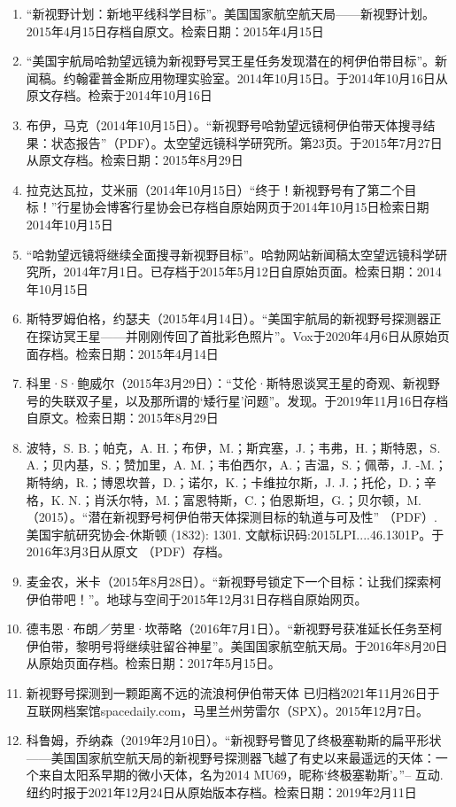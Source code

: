 \begin{enumerate}
\item “新视野计划：新地平线科学目标”。美国国家航空航天局——新视野计划。2015年4月15日存档自原文。检索日期：2015年4月15日
\item “美国宇航局哈勃望远镜为新视野号冥王星任务发现潜在的柯伊伯带目标”。新闻稿。约翰霍普金斯应用物理实验室。2014年10月15日。于2014年10月16日从原文存档。检索于2014年10月16日
\item 布伊，马克（2014年10月15日）。“新视野号哈勃望远镜柯伊伯带天体搜寻结果：状态报告”（PDF）。太空望远镜科学研究所。第23页。于2015年7月27日从原文存档。检索日期：2015年8月29日
\item 拉克达瓦拉，艾米丽（2014年10月15日）“终于！新视野号有了第二个目标！”行星协会博客行星协会已存档自原始网页于2014年10月15日检索日期2014年10月15日
\item “哈勃望远镜将继续全面搜寻新视野目标”。哈勃网站新闻稿太空望远镜科学研究所，2014年7月1日。已存档于2015年5月12日自原始页面。检索日期：2014年10月15日
\item 斯特罗姆伯格，约瑟夫（2015年4月14日）。“美国宇航局的新视野号探测器正在探访冥王星——并刚刚传回了首批彩色照片”。Vox于2020年4月6日从原始页面存档。检索日期：2015年4月14日
\item 科里·S·鲍威尔（2015年3月29日）：“艾伦·斯特恩谈冥王星的奇观、新视野号的失联双子星，以及那所谓的‘矮行星’问题”。发现。于2019年11月16日存档自原文。检索日期：2015年8月29日
\item 波特，S. B.；帕克，A. H.；布伊，M.；斯宾塞，J.；韦弗，H.；斯特恩，S. A.；贝内基，S.；赞加里，A. M.；韦伯西尔，A.；吉温，S.；佩蒂，J. -M.；斯特纳，R.；博恩坎普，D.；诺尔，K.；卡维拉尔斯，J. J.；托伦，D.；辛格，K. N.；肖沃尔特，M.；富恩特斯，C.；伯恩斯坦，G.；贝尔顿，M.（2015）。“潜在新视野号柯伊伯带天体探测目标的轨道与可及性” （PDF）. 美国宇航研究协会-休斯顿 (1832): 1301. 文献标识码:2015LPI....46.1301P。于2016年3月3日从原文 （PDF）存档。
\item 麦金农，米卡（2015年8月28日）。“新视野号锁定下一个目标：让我们探索柯伊伯带吧！”。地球与空间于2015年12月31日存档自原始网页。
\item 德韦恩·布朗／劳里·坎蒂略（2016年7月1日）。“新视野号获准延长任务至柯伊伯带，黎明号将继续驻留谷神星”。美国国家航空航天局。于2016年8月20日从原始页面存档。检索日期：2017年5月15日。
\item 新视野号探测到一颗距离不远的流浪柯伊伯带天体 已归档2021年11月26日于互联网档案馆spacedaily.com，马里兰州劳雷尔（SPX）。2015年12月7日。
\item 科鲁姆，乔纳森（2019年2月10日）。“新视野号瞥见了终极塞勒斯的扁平形状——美国国家航空航天局的新视野号探测器飞越了有史以来最遥远的天体：一个来自太阳系早期的微小天体，名为2014 MU69，昵称‘终极塞勒斯’。”– 互动.纽约时报于2021年12月24日从原始版本存档。检索日期：2019年2月11日

\end{enumerate}
